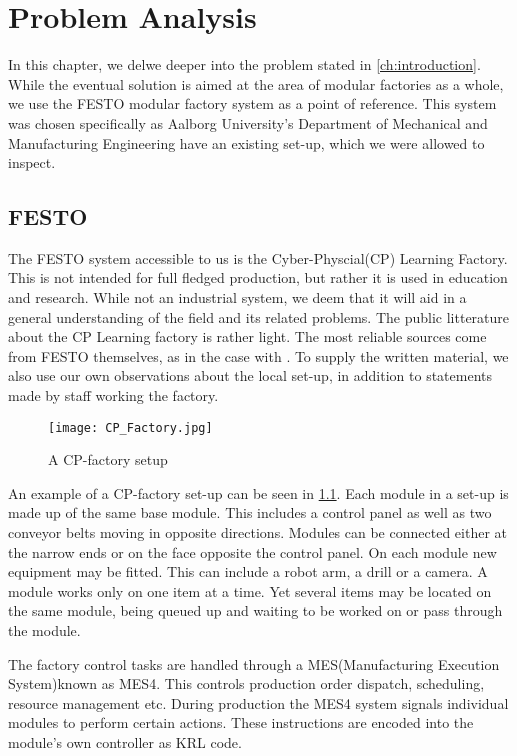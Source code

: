 \chapter{Problem Analysis}\label{ch:problemanalysis}
In this chapter, we delwe deeper into the problem stated in \cref{ch:introduction}. While the eventual solution is aimed at the area of modular factories as a whole, we use the FESTO modular factory system \cite{FESTOweb} as a point of reference. This system was chosen specifically as Aalborg University's Department of Mechanical and Manufacturing Engineering have an existing set-up, which we were allowed to inspect. 

\section{FESTO}\label{sec:festo}
The FESTO system accessible to us is the Cyber-Physcial(CP) Learning Factory. This is not intended for full fledged production, but rather it is used in education and research. While not an industrial system, we deem that it will aid in a general understanding of the field and its related problems. The public litterature about the CP Learning factory is rather light. The most reliable sources come from FESTO themselves, as in the case with \cite{CPFactory2015}. To supply the written material, we also use our own observations about the local set-up, in addition to statements made by staff working the factory.  

\begin{figure}[h]
\centering
\texttt{[image: CP\_Factory.jpg]}
\caption{A CP-factory setup}
\label{fig:festo-example}
\end{figure}

An example of a CP-factory set-up can be seen in \cref{fig:festo-example}. Each module in a set-up is made up of the same base module. This includes a control panel as well as two conveyor belts moving in opposite directions. Modules can be connected either at the narrow ends or on the face opposite the control panel. On each module new equipment may be fitted. This can include a robot arm, a drill or a camera. A module works only on one item at a time. Yet several items may be located on the same module, being queued up and waiting to be worked on or pass through the module.

The factory control tasks are handled through a MES(Manufacturing Execution System)known as MES4. This controls production order dispatch, scheduling, resource management etc. During production the MES4 system signals individual modules to perform certain actions. These instructions are encoded into the module's own controller as KRL code.

